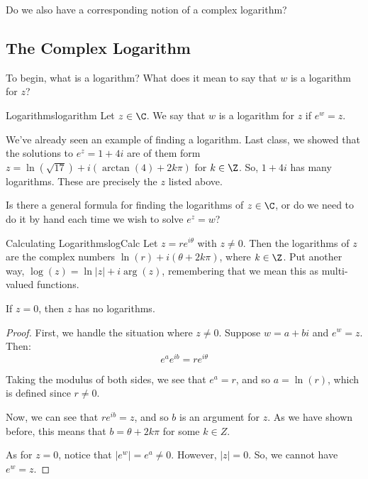 Do we also have a corresponding notion of a complex logarithm?

\subsection{The Complex Logarithm}

To begin, what is a logarithm? What does it mean to say that $w$ is a logarithm for $z$?

\begin{defbo}{Logarithms}{logarithm} 
Let $z\in \C$. We say that $w$ is a logarithm for $z$ if $e^w = z$.
\end{defbo}

We've already seen an example of finding a logarithm. Last class, we showed that the solutions to $e^{z} = 1 + 4i$ are of them form $z = \ln(\sqrt{17}) + i(\arctan(4) + 2k\pi)$ for $k\in \Z$. So, $1 + 4i$ has many logarithms. These are precisely the $z$ listed above.


Is there a general formula for finding the logarithms of $z\in \C$, or do we need to do it by hand each time we wish to solve $e^z = w$?

\begin{thmbo}{Calculating Logarithms}{logCalc}
 Let $z = re^{i\theta}$ with $z\ne 0$. Then the logarithms of $z$ are the complex numbers $\ln(r) + i(\theta + 2k\pi)$, where $k\in \Z$. Put another way, $\log(z) = \ln|z| + i\arg(z)$, remembering that we mean this as multi-valued functions.


If $z = 0$, then $z$ has no logarithms.
\end{thmbo}

\begin{proof} First, we handle the situation where $z\ne 0$. Suppose $w = a +bi$ and $e^w = z$. Then:
$$e^ae^{ib} = re^{i\theta}$$

Taking the modulus of both sides, we see that $e^a = r$, and so $a = \ln(r)$, which is defined since $r\ne 0$.

Now, we can see that $re^{ib} = z$, and so $b$ is an argument for $z$. As we have shown before, this means that $b = \theta + 2k\pi$ for some $k\in Z$.

As for $z = 0$, notice that $|e^w| = e^a \ne 0$. However, $|z| = 0$. So, we cannot have $e^w = z$.

\end{proof}
